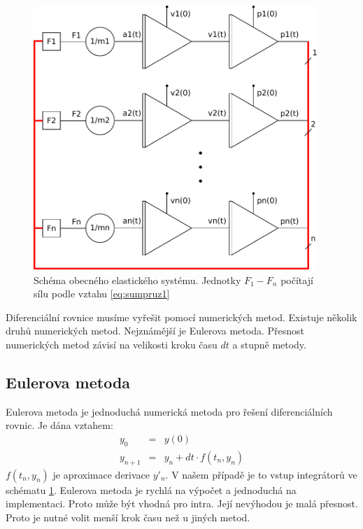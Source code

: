 \begin{figure}[h]
\centering
\includegraphics[height=10cm,keepaspectratio]{obr/intschema.pdf}
\caption{Schéma obecného elastického systému.
Jednotky $F_1 - F_n$ počítají sílu podle vztahu \ref{eq:sumpruz1}}
\label{fig:intschema}
\end{figure}

Diferenciální rovnice musíme vyřešit pomocí numerických metod.
Existuje několik druhů numerických metod.
Nejznámější je Eulerova metoda.
Přesnost numerických metod závisí na velikosti kroku času $dt$ a stupně metody.

\subsection{Eulerova metoda}
Eulerova metoda je jednoduchá numerická metoda pro řešení diferenciálních rovnic.
Je dána vztahem:
\begin{eqnarray*}
\label{eq:eulerint}
y_0     &=& y(0)    \\
y_{n+1} &=& y_{n} + dt \cdot f(t_n,y_{n})
\end{eqnarray*}
$f(t_n,y_n)$ je aproximace derivace $y'_n$.
V našem případě je to vstup integrátorů ve schématu \ref{fig:intschema}.
Eulerova metoda je rychlá na výpočet a jednoduchá na implementaci.
Proto může být vhodná pro intra.
Její nevýhodou je malá přesnost.
Proto je nutné volit menší krok času než u jiných metod.
